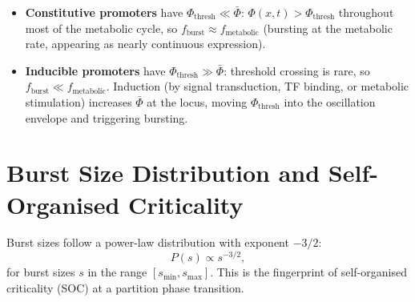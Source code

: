 \begin{corollary}
\label{cor:constitutive_inducible}
\begin{itemize}
  \item \textbf{Constitutive promoters} have $\Phi_{\mathrm{thresh}} \ll \bar\Phi$:
        $\Phi(x,t) > \Phi_{\mathrm{thresh}}$ throughout most of the metabolic
        cycle, so $f_{\mathrm{burst}} \approx f_{\mathrm{metabolic}}$ (bursting
        at the metabolic rate, appearing as nearly continuous expression).
  \item \textbf{Inducible promoters} have $\Phi_{\mathrm{thresh}} \gg \bar\Phi$:
        threshold crossing is rare, so $f_{\mathrm{burst}} \ll f_{\mathrm{metabolic}}$.
        Induction (by signal transduction, TF binding, or metabolic stimulation)
        increases $\bar\Phi$ at the locus, moving $\Phi_{\mathrm{thresh}}$ into
        the oscillation envelope and triggering bursting.
\end{itemize}
\end{corollary}

\section{Burst Size Distribution and Self-Organised Criticality}
\label{sec:burst_soc}

\begin{theorem}
\label{thm:burst_size}
Burst sizes follow a power-law distribution with exponent $-3/2$:
\begin{equation}
  P(s) \propto s^{-3/2},
  \label{eq:burst_size_powerlaw}
\end{equation}
for burst sizes $s$ in the range $[s_{\min}, s_{\max}]$. This is the
fingerprint of self-organised criticality (SOC) at a partition phase
transition.
\end{theorem}

